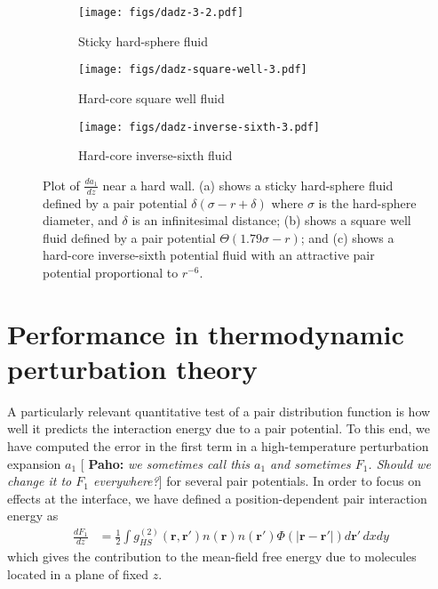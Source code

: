\documentclass[letterpaper,twocolumn,amsmath,amssymb,pre,aps,10pt]{revtex4-1}
\newcommand{\green}[1]{{\bf \color{green} #1}}
\newcommand{\rr}{\textbf{r}}
\newcommand{\pahosays}[1]{{\color{red} [\green{Paho:} \emph{#1}]}}
\begin{document}
\begin{figure}
  \begin{subfigure}{1.0\columnwidth}
    \texttt{[image: figs/dadz-3-2.pdf]}
    \vspace{-0.8cm}
    \caption{Sticky hard-sphere fluid}\label{fig:dadz-delta}
  \end{subfigure}
  \begin{subfigure}{1.0\columnwidth}
    \texttt{[image: figs/dadz-square-well-3.pdf]}
    \vspace{-0.8cm}
    \caption{Hard-core square well fluid}\label{fig:dadz-square-well}
  \end{subfigure}
  \begin{subfigure}{1.0\columnwidth}
    \texttt{[image: figs/dadz-inverse-sixth-3.pdf]}
    \vspace{-0.8cm}
    \caption{Hard-core inverse-sixth fluid}\label{fig:dadz-inverse-sixth}
  \end{subfigure}
  \caption{Plot of $\frac{da_1}{dz}$ near a hard wall.  (a) shows a
    sticky hard-sphere fluid defined by a pair potential
    $\delta(\sigma-r+\delta)$ where $\sigma$ is the hard-sphere
    diameter, and $\delta$ is an infinitesimal distance; (b) shows a
    square well fluid defined by a pair potential $\Theta(1.79
    \sigma-r)$; and (c) shows a hard-core inverse-sixth potential
    fluid with an attractive pair potential proportional to $r^{-6}$.
  }
  \label{fig:dadz}
\end{figure}

\section{Performance in thermodynamic perturbation theory}

A particularly relevant quantitative test of a pair distribution
function is how well it predicts the interaction energy due to a pair
potential.  To this end, we have computed the error in the first term
in a high-temperature perturbation expansion $a_1$
\pahosays{we sometimes call this $a_1$ and sometimes $F_1$. Should we
  change it to $F_1$ everywhere?}
for several pair potentials.  In order to focus on effects at the
interface, we have defined a position-dependent pair interaction
energy as
\begin{align}
  \frac{dF_1}{dz} &=
  \tfrac12 \int g^{(2)}_{HS}(\rr,\rr')n(\rr)n(\rr')\Phi(|\rr-\rr'|)
  d\rr'\, dxdy\label{eq:da1}
\end{align}
which gives the contribution to the mean-field free energy due to
molecules located in a plane of fixed $z$.
\end{document}
